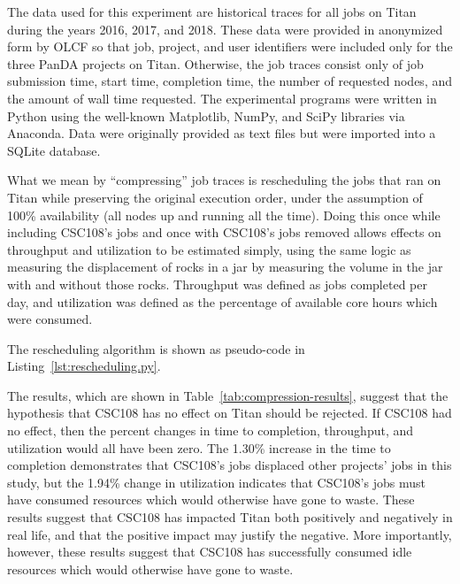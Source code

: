 The data used for this experiment are historical traces for all jobs on Titan
during the years 2016, 2017, and 2018. These data were provided in anonymized
form by OLCF so that job, project, and user identifiers were included only for
the three PanDA projects on Titan. Otherwise, the job traces consist only of
job submission time, start time, completion time, the number of requested
nodes, and the amount of wall time requested. The experimental programs were
written in Python using the well-known Matplotlib, NumPy, and SciPy libraries
via Anaconda. Data were originally provided as text files but were imported
into a SQLite database.

What we mean by ``compressing'' job traces is rescheduling the jobs that ran
on Titan while preserving the original execution order, under the assumption of
100\% availability (all nodes up and running all the time). Doing this once
while including CSC108's jobs and once with CSC108's jobs removed allows
effects on throughput and utilization to be estimated simply, using the same
logic as measuring the displacement of rocks in a jar by measuring the volume
in the jar with and without those rocks. Throughput was defined as jobs
completed per day, and utilization was defined as the percentage of available
core hours which were consumed.

The rescheduling algorithm is shown as pseudo-code in
Listing~\ref{lst:rescheduling.py}.



The results, which are shown in Table~\ref{tab:compression-results}, suggest
that the hypothesis that CSC108 has no effect on Titan should be rejected. If
CSC108 had no effect, then the percent changes in time to completion,
throughput, and utilization would all have been zero. The 1.30\% increase in
the time to completion demonstrates that CSC108's jobs displaced other
projects' jobs in this study, but the 1.94\% change in utilization indicates
that CSC108's jobs must have consumed resources which would otherwise have gone
to waste. These results suggest that CSC108 has impacted Titan both positively
and negatively in real life, and that the positive impact may justify the
negative. More importantly, however, these results suggest that CSC108 has
successfully consumed idle resources which would otherwise have gone to waste.




